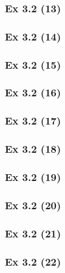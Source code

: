 \subsubsection{Ex 3.2 (13)}\label{sec:Ex_3.2.13}

\subsubsection{Ex 3.2 (14)}\label{sec:Ex_3.2.14}

\subsubsection{Ex 3.2 (15)}\label{sec:Ex_3.2.15}

\subsubsection{Ex 3.2 (16)}\label{sec:Ex_3.2.16}

\subsubsection{Ex 3.2 (17)}\label{sec:Ex_3.2.17}

\subsubsection{Ex 3.2 (18)}\label{sec:Ex_3.2.18}

\subsubsection{Ex 3.2 (19)}\label{sec:Ex_3.2.19}

\subsubsection{Ex 3.2 (20)}\label{sec:Ex_3.2.20}

\newpage		%

\subsubsection{Ex 3.2 (21)}\label{sec:Ex_3.2.21}

\subsubsection{Ex 3.2 (22)}\label{sec:Ex_3.2.22}

